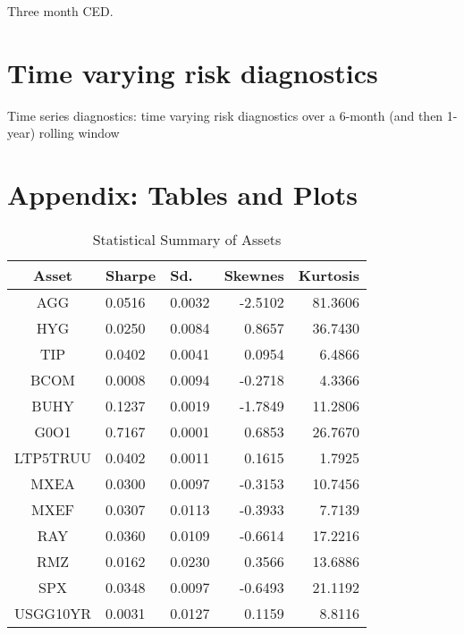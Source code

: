 \documentclass[12pt]{article}
\begin{document}
Three month CED.



\section{Time varying risk diagnostics}


Time series diagnostics: time varying risk diagnostics over a 6-month (and then 1-year) rolling window


\section{Appendix: Tables and Plots}


\begin{table}[!h]
\caption{Statistical Summary of Assets} %
\centering 
\begin{tabular}{ | c || p{1.5cm} p{1.5cm} r r | } 
 \hline
Asset & Sharpe  & Sd. & Skewnes & Kurtosis \\
  \hline \hline
AGG & 0.0516 & 0.0032 & -2.5102 & 81.3606\\ 
HYG & 0.0250 & 0.0084 &  0.8657 & 36.7430\\ 
TIP & 0.0402 & 0.0041 &  0.0954 &  6.4866\\ 
BCOM & 0.0008 & 0.0094 & -0.2718 &  4.3366\\ 
BUHY & 0.1237 & 0.0019 & -1.7849 & 11.2806\\ 
G0O1 & 0.7167 & 0.0001 &  0.6853 & 26.7670\\ 
LTP5TRUU & 0.0402 & 0.0011 &  0.1615 &  1.7925\\ 
MXEA & 0.0300 & 0.0097 & -0.3153 & 10.7456\\ 
MXEF & 0.0307 & 0.0113 & -0.3933 &  7.7139\\ 
RAY & 0.0360 & 0.0109 & -0.6614 & 17.2216\\ 
RMZ & 0.0162 & 0.0230 &  0.3566 & 13.6886\\ 
SPX & 0.0348 & 0.0097 & -0.6493 & 21.1192\\ 
USGG10YR & 0.0031 & 0.0127 &  0.1159 &  8.8116 \\
 \hline
\end{tabular}
\label{table:statSum}
\end{table}
\end{document}
